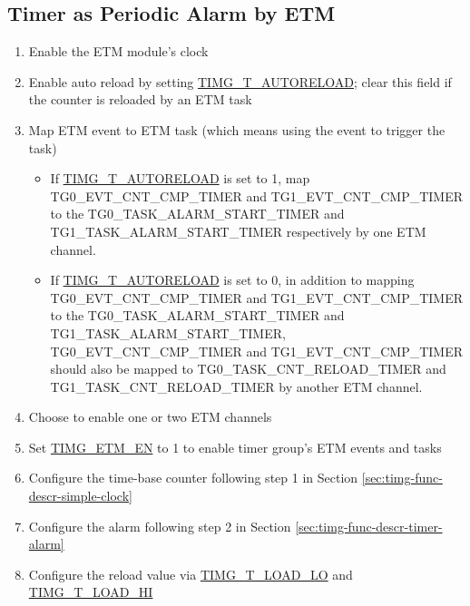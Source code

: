 \documentclass[main\_\_EN.tex]{subfiles}
\begin{document}
\subsection{Timer as Periodic Alarm by ETM}
\label{sec:timg-conf-etm}

\begin{enumerate}
    \item Enable the ETM module's clock
    \item Enable auto reload by setting \hyperref[fielddesc:TIMGTXAUTORELOAD]{TIMG\_T\_AUTORELOAD}; clear this field if the counter is reloaded by an ETM task
    \item Map ETM event to ETM task (which means using the event to trigger the task)
    \begin{itemize}
        \item If \hyperref[fielddesc:TIMGTXAUTORELOAD]{TIMG\_T\_AUTORELOAD} is set to 1, map TG0\_EVT\_CNT\_CMP\_TIMER and TG1\_EVT\_CNT\_CMP\_TIMER to the TG0\_TASK\_ALARM\_START\_TIMER and TG1\_TASK\_ALARM\_START\_TIMER respectively by one ETM channel.
        \item If \hyperref[fielddesc:TIMGTXAUTORELOAD]{TIMG\_T\_AUTORELOAD} is set to 0, in addition to mapping TG0\_EVT\_CNT\_CMP\_TIMER and TG1\_EVT\_CNT\_CMP\_TIMER to the TG0\_TASK\_ALARM\_START\_TIMER and TG1\_TASK\_ALARM\_START\_TIMER, TG0\_EVT\_CNT\_CMP\_TIMER and TG1\_EVT\_CNT\_CMP\_TIMER should also be mapped to TG0\_TASK\_CNT\_RELOAD\_TIMER and TG1\_TASK\_CNT\_RELOAD\_TIMER by another ETM channel.
    \end{itemize}
    \item Choose to enable one or two ETM channels
    \item Set \hyperref[fielddesc:TIMGETMEN]{TIMG\_ETM\_EN} to 1 to enable timer group's ETM events and tasks
    \item Configure the time-base counter following step 1 in Section \ref{sec:timg-func-descr-simple-clock} \textit{}
    \item Configure the alarm following step 2 in Section \ref{sec:timg-func-descr-timer-alarm} \textit{}
    \item Configure the reload value via \hyperref[fielddesc:TIMGTXLOADLO]{TIMG\_T\_LOAD\_LO} and \hyperref[fielddesc:TIMGTXLOADHI]{TIMG\_T\_LOAD\_HI}

\end{enumerate}
\end{document}
